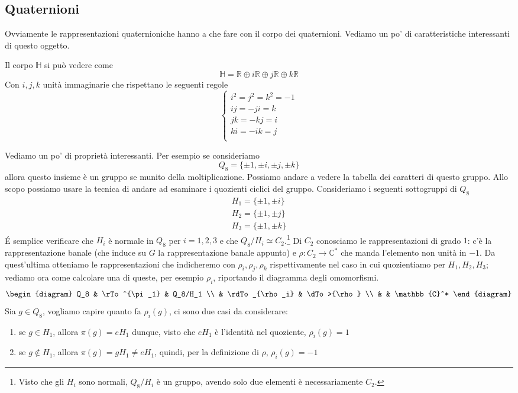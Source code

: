 \documentclass[11pt]{article}
\theoremstyle{plain}
\theoremstyle{definition}
\theoremstyle{remark}
\newcommand{\C}{\mathbb{C}}
\newcommand{\R}{\mathbb{R}}
\newcommand{\HH}{\mathbb{H}}
\DeclareMathOperator{\iso}{\simeq}
\newcommand{\tridiag}[6]{
	  \begin{diagram}
	  #1 & \rTo^{#2}  & #3        \\
	     & \rdTo_{#6} & \dTo>{#4}   \\
	     &          & #5
	  \end{diagram}
}
\begin{document}
\subsection{Quaternioni}
\label{sec:quaternioni}
Ovviamente le rappresentazioni quaternioniche hanno a che fare con il corpo dei quaternioni. Vediamo un po' di caratteristiche interessanti di questo oggetto.

Il corpo $\HH$ si può vedere come
\[\HH = \R \oplus i \R \oplus j \R \oplus k \R \]
Con $i,j,k$ unità immaginarie che rispettano le seguenti regole
\[
\begin{cases}
i^2 = j^2 = k^2 = -1 \\
ij = - ji = k \\
jk = -kj = i \\
ki = - ik = j \\
\end{cases}
\]

Vediamo un po' di proprietà interessanti. Per esempio se consideriamo
\[ Q_8 =  \{\pm 1, \pm i, \pm j, \pm k \}\]
allora questo insieme è un gruppo se munito della moltiplicazione. Possiamo andare a vedere la tabella dei caratteri di questo gruppo.
Allo scopo possiamo usare la tecnica di andare ad esaminare i quozienti ciclici del gruppo.
Consideriamo i seguenti sottogruppi di $Q_8$
\begin{align*}
	H_1=\{ \pm1, \pm i \}\\
	H_2=\{ \pm1, \pm j \}\\
	H_3=\{ \pm1, \pm k \}
\end{align*}
\'E semplice verificare che $H_i$ è normale in $Q_8$ per $i=1,2,3$ e che $Q_8/H_i\iso C_2$.\footnote{Visto che gli $H_i$ sono normali, $Q_8/H_i$ è un gruppo, avendo solo due elementi è necessariamente $C_2$.} Di $C_2$ conosciamo le rappresentazioni di grado $1$: c'è la rappresentazione banale (che induce su $G$ la rappresentazione banale appunto) e $\rho:C_2\to \C^*$ che manda l'elemento non unità in $-1$. Da quest'ultima otteniamo le rappresentazioni che indicheremo con $\rho_i, \rho_j, \rho_k$ rispettivamente nel caso in cui quozientiamo per $H_1, H_2, H_3$; vediamo ora come calcolare una di queste, per esempio $\rho_i$, riportando il diagramma degli omomorfismi.
\[\tridiag {Q_8} {\pi_1} {Q_8/H_1} \rho {\C^*} {\rho_i}\]
Sia $g\in Q_8$, vogliamo capire quanto fa $\rho_i(g)$, ci sono due casi da considerare:
\begin{enumerate}
	\item se $g\in H_1$, allora $\pi(g) = eH_1$ dunque, visto che $eH_1$ è l'identità nel quoziente, $\rho_i(g)=1$
	\item se $g\not\in H_1$, allora $\pi(g) =gH_1\neq eH_1$, quindi, per la definizione di $\rho$, $\rho_i(g)=-1$
\end{enumerate}
\end{document}
